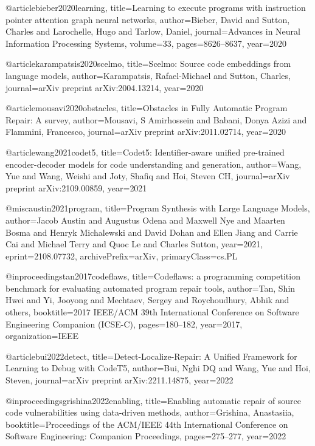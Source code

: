 
@article{bieber2020learning,
  title={Learning to execute programs with instruction pointer attention graph neural networks},
  author={Bieber, David and Sutton, Charles and Larochelle, Hugo and Tarlow, Daniel},
  journal={Advances in Neural Information Processing Systems},
  volume={33},
  pages={8626--8637},
  year={2020}
}

@article{karampatsis2020scelmo,
  title={Scelmo: Source code embeddings from language models},
  author={Karampatsis, Rafael-Michael and Sutton, Charles},
  journal={arXiv preprint arXiv:2004.13214},
  year={2020}
}

@article{mousavi2020obstacles,
  title={Obstacles in Fully Automatic Program Repair: A survey},
  author={Mousavi, S Amirhossein and Babani, Donya Azizi and Flammini, Francesco},
  journal={arXiv preprint arXiv:2011.02714},
  year={2020}
}


@article{wang2021codet5,
  title={Codet5: Identifier-aware unified pre-trained encoder-decoder models for code understanding and generation},
  author={Wang, Yue and Wang, Weishi and Joty, Shafiq and Hoi, Steven CH},
  journal={arXiv preprint arXiv:2109.00859},
  year={2021}
}

@misc{austin2021program,
      title={Program Synthesis with Large Language Models}, 
      author={Jacob Austin and Augustus Odena and Maxwell Nye and Maarten Bosma and Henryk Michalewski and David Dohan and Ellen Jiang and Carrie Cai and Michael Terry and Quoc Le and Charles Sutton},
      year={2021},
      eprint={2108.07732},
      archivePrefix={arXiv},
      primaryClass={cs.PL}
}

@inproceedings{tan2017codeflaws,
  title={Codeflaws: a programming competition benchmark for evaluating automated program repair tools},
  author={Tan, Shin Hwei and Yi, Jooyong and Mechtaev, Sergey and Roychoudhury, Abhik and others},
  booktitle={2017 IEEE/ACM 39th International Conference on Software Engineering Companion (ICSE-C)},
  pages={180--182},
  year={2017},
  organization={IEEE}
}


@article{bui2022detect,
  title={Detect-Localize-Repair: A Unified Framework for Learning to Debug with CodeT5},
  author={Bui, Nghi DQ and Wang, Yue and Hoi, Steven},
  journal={arXiv preprint arXiv:2211.14875},
  year={2022}
}

@inproceedings{grishina2022enabling,
  title={Enabling automatic repair of source code vulnerabilities using data-driven methods},
  author={Grishina, Anastasiia},
  booktitle={Proceedings of the ACM/IEEE 44th International Conference on Software Engineering: Companion Proceedings},
  pages={275--277},
  year={2022}
}


